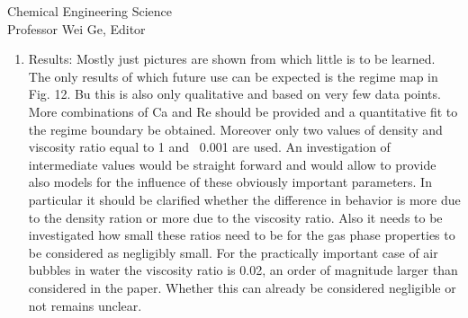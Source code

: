 \documentclass{letter}
\begin{document}
\begin{letter}{
Chemical Engineering Science\\
Professor Wei Ge, Editor\\}
\begin{enumerate}
Response: \\
		There are two main problems identified from the referee: (a) the grid refinement study does not demonstrate enough convergence and (b) even if we could refine the grid an infinite number of times, our break-up model is insufficient and whatever findings that we have would be completely different than if we were able to model the break-up process with a molecular scale model.  We disagree with the referee; we have added more references to our article in which the uncertainty in our article is smaller than that in the latest existing work. Also we note that existing articles on bubble and drop breakup due to shear do not take into account sub-scale models either and these articles demonstrate reasonable agreement with experiments (as does our submission).  Note: if we were considering the merging of droplets in which bouncing versus merging can occur, then sub-scale drainage can be important to model.  This issue is not relevent for our article though.  We have added this discussion to the introduction.

Finally, we note that our simulations already take about one year.  The bubble deformation case, is a much more challenging problem than the drop case due to the large density ratio.  Anymore refinement would extend the time of simulation to 8 years using current technology.  It is agreed though that speeding up the algorithm in order to run more efficiently would certainly reduce the uncertainty of our results even more.  This is future work.

\par\noindent
\item
\textsf
{Results: Mostly just pictures are shown from which little is to be learned. The only results of which future use can be expected is the regime map in Fig. 12. Bu this is also only qualitative and based on very few data points. More combinations of Ca and Re should be provided and a quantitative fit to the regime boundary be obtained. Moreover only two values of density and viscosity ratio equal to 1 and ~0.001 are used. An investigation of intermediate values would be straight forward and would allow to provide also models for the influence of these obviously important parameters. In particular it should be clarified whether the difference in behavior is more due to the density ration or more due to the viscosity ratio. Also it needs to be investigated how small these ratios need to be for the gas phase properties to be considered as negligibly small. For the practically important case of air bubbles in water the viscosity ratio is 0.02, an order of magnitude larger than considered in the paper. Whether this can already be considered negligible or not remains unclear.}
\vspace{3 mm}


\end{enumerate}
\end{letter}
\end{document}
